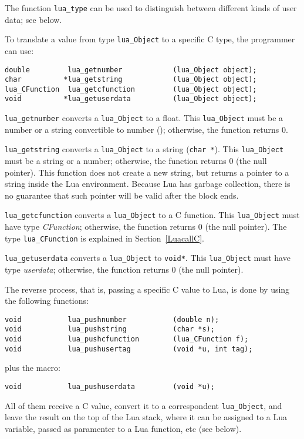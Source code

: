 The function \verb'lua_type' can be used to distinguish between
different kinds of user data; see below.

To translate a value from type \verb'lua_Object' to a specific C type,
the programmer can use:
\begin{verbatim}
double         lua_getnumber            (lua_Object object);
char          *lua_getstring            (lua_Object object);
lua_CFunction  lua_getcfunction         (lua_Object object);
void          *lua_getuserdata          (lua_Object object);
\end{verbatim}
\verb'lua_getnumber' converts a \verb'lua_Object' to a float.
This \verb'lua_Object' must be a number or a string convertible to number
(); otherwise, the function returns 0.

\verb'lua_getstring' converts a \verb'lua_Object' to a string (\verb'char *').
This \verb'lua_Object' must be a string or a number;
otherwise, the function returns 0 (the null pointer).
This function does not create a new string, but returns a pointer to
a string inside the Lua environment.
Because Lua has garbage collection, there is no guarantee that such
pointer will be valid after the block ends.

\verb'lua_getcfunction' converts a \verb'lua_Object' to a C function.
This \verb'lua_Object' must have type {\em CFunction\/};
otherwise, the function returns 0 (the null pointer).
The type \verb'lua_CFunction' is explained in Section~\ref{LuacallC}.

\verb'lua_getuserdata' converts a \verb'lua_Object' to \verb'void*'.
This \verb'lua_Object' must have type {\em userdata\/};
otherwise, the function returns 0 (the null pointer).

The reverse process, that is, passing a specific C value to Lua,
is done by using the following functions:
\begin{verbatim}
void           lua_pushnumber           (double n);
void           lua_pushstring           (char *s);
void           lua_pushcfunction        (lua_CFunction f);
void           lua_pushusertag          (void *u, int tag);
\end{verbatim}
plus the macro:
\begin{verbatim}
void           lua_pushuserdata         (void *u);
\end{verbatim}
All of them receive a C value,
convert it to a correspondent \verb'lua_Object',
and leave the result on the top of the Lua stack,
where it can be assigned to a Lua variable,
passed as paramenter to a Lua function, etc (see below). \label{pushing}

